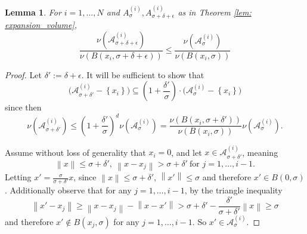 \documentclass{article}
\newcommand{\set}[1]{\left\{#1\right\}}
\newcommand{\norm}[1]{\left\lVert#1\right\rVert}
\newcommand{\1}{\mathbf{1}}
\newcommand{\Aset}{\mathcal{A}}
\newcommand{\Asig}{\Aset_{\sigma}}
\theoremstyle{aldenthm}
\newtheorem{lemma}{Lemma}
\begin{document}
\begin{lemma}
	\label{lem: covering}
	For $i = 1, \ldots, N$ and  $A_{\sigma}^{(i)}, A_{\sigma + \delta + \epsilon}^{(i)}$ as in Theorem \ref{lem: expansion_volume},
	\begin{equation*}
	\frac{\nu(\Aset_{\sigma + \delta + \epsilon}^{(i)})}{\nu(B(x_i, \sigma + \delta + \epsilon))} \leq \frac{\nu(\Aset_{\sigma}^{(i)})}{\nu(B(x_i, \sigma))}
	\end{equation*}
\end{lemma}
\begin{proof}
	Let $\delta' := \delta + \epsilon$. It will be sufficient to show that
	\begin{equation*}
	\biggl(\Aset_{\sigma + \delta'}^{(i)} - \set{x_i}\biggr) \subseteq \left(1 + \frac{\delta'}{\sigma}\right)\cdot\biggl(\Asig^{(i)} - \set{x_i}\biggr) 
	\end{equation*}
	since then
	\begin{equation*}
	\nu(\Aset_{\sigma + \delta'}^{(i)}) \leq \left(1 + \frac{\delta'}{\sigma}\right)^d \nu(\Aset_{\sigma}^{(i)}) = \frac{\nu(B(x_i, \sigma + \delta'))}{\nu(B(x_i, \sigma))} \nu(\Aset_{\sigma}^{(i)}).
	\end{equation*}
	
	Assume without loss of generality that $x_i = 0$, and let $x \in \Aset_{\sigma + \delta'}^{(i)}$, meaning
	\begin{equation}
	\norm{x} \leq \sigma + \delta',~ \norm{x - x_j} > \sigma + \delta'~ \textrm{for $j = 1, \ldots, i - 1$}.
	\end{equation}
	Letting $x' = \frac{\sigma}{\sigma + \delta'} x$, since $\norm{x} \leq \sigma + \delta'$, $\norm{x'} \leq \sigma$ and therefore $x' \in B(0,\sigma)$. Additionally observe that for any $j = 1, \ldots, i - 1$, by the triangle inequality
	\begin{equation*}
	\norm{x' - x_j} \geq \norm{x - x_j} - \norm{x - x'} > \sigma + \delta' - \frac{\delta'}{\sigma + \delta'}\norm{x} \geq \sigma
	\end{equation*}
	and therefore $x' \not\in B(x_j,\sigma)$ for any $j = 1,\ldots, i - 1$. So $x' \in \Asig^{(i)}$.
\end{proof}
\end{document}
